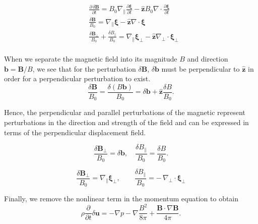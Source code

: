 \begin{equation*}
 \begin{split}
     &\frac{\partial\,\delta\boldsymbol{B}}{\partial t}
    = B_{0}\nabla_{\parallel}\frac{\partial\boldsymbol{\xi}}{\partial t}
      - \hat{\boldsymbol{z}} B_{0}\nabla\cdot\frac{\partial\boldsymbol{\xi}}{\partial t}\\
    &\frac{\delta \boldsymbol{B}}{B_{0}}
    = \nabla_{\parallel}\boldsymbol{\xi} - \hat{\boldsymbol{z}}\nabla\cdot\boldsymbol{\xi}\\
    &\frac{\delta \boldsymbol{B}_{\perp}}{B_{0}}+\frac{\delta B_{\parallel}}{B_{0}} 
    = \nabla_{\parallel}\boldsymbol{\xi}_{\perp}
      - \hat{\boldsymbol{z}}\nabla_{\perp}\cdot\boldsymbol{\xi}_{\perp}\\
  \end{split}
\end{equation*}

When we separate the magnetic field into its magnitude \(B\) and direction \(\boldsymbol{b}= \boldsymbol{B}/B\), we see that for the perturbation \(\delta \boldsymbol{B}\),  \(\delta \boldsymbol{b}\) must be perpendicular to \(\hat{\boldsymbol{z}}\) in order for a perpendicular perturbation to exist.
\begin{equation*}
    \frac{\delta \boldsymbol{B}}{B_{0}} = \frac{\delta (B \boldsymbol{b})}{B_{0}} = \delta \boldsymbol{b} + \hat{\boldsymbol{z}} \frac{\delta B}{B_{0}} .
\end{equation*}

Hence, the perpendicular and parallel perturbations of the magnetic represent perturbations in the direction and strength of the field and can be expressed in terms of the perpendicular displacement field.

\begin{equation*}
    \frac{\delta \boldsymbol{B}_{\perp}}{B_0} = \delta \boldsymbol{b}, \quad
    \frac{\delta B_{\parallel}}{B_0} = \frac{\delta B}{B_0}.
\end{equation*}

\begin{equation}
    \frac{\delta \boldsymbol{B}_{\perp}}{B_{0}} = \nabla_{\parallel}\boldsymbol{\xi}_{\perp},
    \qquad
    \frac{\delta B_{\parallel}}{B_{0}} = -\,\nabla_{\perp}\cdot\boldsymbol{\xi}_{\perp}
    \label{eq:Magnetic pert}
\end{equation}

Finally, we remove the nonlinear term in the momentum equation to obtain
\begin{equation*}
     \rho \frac{\partial }{\partial t} \delta\boldsymbol{u}
    = - \nabla p - \nabla \frac{B^{2}}{8\pi}  + \frac{\boldsymbol{B}\cdot \nabla\boldsymbol{B}}{4\pi}.  
\end{equation*}

